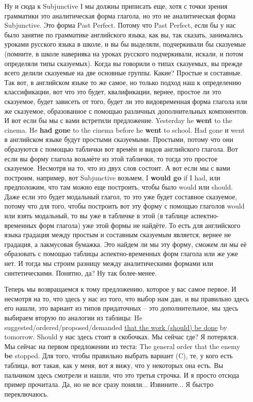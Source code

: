 \documentclass[main.tex]{subfiles}
\begin{document}
Ну и сюда к Subjunctive I мы должны приписать еще, хотя с точки зрения грамматики это аналитическая форма глагола, но это не аналитическая форма Subjunctive.
Это форма Past Perfect.
Потому что Past Perfect, если бы у нас было занятие по грамматике английского языка, как вы, так сказать, занимались уроками русского языка в школе, и вы бы выделяли, подчеркивали бы сказуемые (помните, в школе наверняка на уроках русского подчеркивали, искали, и потом определяли типы сказуемых).
Когда вы говорили о типах сказуемых, вы прежде всего делили сказуемые на две основные группы.
Какие?
Простые и составные.
Так вот, в английском языке то же самое, но только подход наш к определению классификации, вот что это будет, квалификации, вернее, простое ли это сказуемое, будет зависеть от того, будет ли это видовременная форма глагола или же сказуемое, образованное с помощью различных дополнительных компонентов.
И вот если бы мы с вами встретили предложение.
Yesterday he \textbf{went} to the cinema.
He \textbf{had gone} to the cinema before he \textbf{went} to school.
Had gone и went в английском языке будут простыми сказуемыми.
Простыми, потому что они образуются с помощью таблички вот времён и видов английского глагола.
Вот если вы форму глагола возьмёте из этой таблички, то тогда это простое сказуемое.
Несмотря на то, что из двух слов состоит.
А вот если мы с вами построим, например, вот Subjunctive возьмем, I \textbf{would go} if I had, или предположим, что там можно еще построить, чтобы было would или should.
Даже если это будет модальный глагол, то это уже будет составное сказуемое, потому что для того, чтобы построить вот эту форму с помощью глаголов would или взять модальный, то вы уже в табличке в этой (в таблице аспектно-временных форм глагола) уже этой формы не найдёте.
То есть для английского языка градация между простым и составным сказуемым является, вернее не градация, а лакмусовая бумажка.
Это найдем ли мы эту форму, сможем ли мы её образовать с помощью таблицы аспектно-временных форм глагола или же уже нет.
И тогда мы строим разницу между аналитическими формами или синтетическими.
Понятно, да?
Ну так более-менее.

Теперь мы возвращаемся к тому предложению, которое у вас самое первое.
И несмотря на то, что здесь у нас из того, что выбор нам дан, и вы правильно здесь его нашли, это вариант из типов придаточных -- это дополнительное, мы здесь выбираем вторую по аналогии из таблицы: He suggested/ordered/proposed/demanded \uline{that the work (should) be done} by tomorrow.
Should у нас здесь стоит в скобочках.
Мы сейчас где?
Я потерялся.
Мы сейчас на первом предложении из теста: The general order that the enemy \textbf{be} stopped.
Для того, чтобы правильно выбрать вариант (C), те, у кого есть таблица, вот такая, как у меня, вот я вижу, что у некоторых она есть.
Вы пальчиком здесь смотрели и нашли, что это третья строчка.
И я просто отсюда пример прочитала.
Да, но не все сразу поняли...
Извините...
Я быстро переключаюсь.
\end{document}
